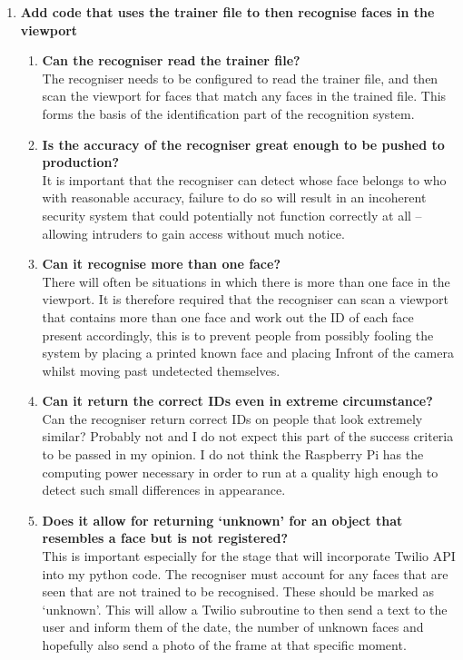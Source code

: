 \documentclass[9pt]{article}
\begin{document}
\begin{small}
\begin{enumerate}
		\item \textbf{Add code that uses the trainer file to then recognise faces in the viewport}
		\begin{enumerate}
			\item \textbf{Can the recogniser read the trainer file?}\\
				The recogniser needs to be configured to read the trainer file, and then scan the viewport for faces that match any faces in the trained file. This forms the basis of the identification part of the recognition system.
			\item \textbf{Is the accuracy of the recogniser great enough to be pushed to production?}\\
				It is important that the recogniser can detect whose face belongs to who with reasonable accuracy, failure to do so will result in an incoherent security system that could potentially not function correctly at all – allowing intruders to gain access without much notice.
			\item \textbf{Can it recognise more than one face?}\\
				There will often be situations in which there is more than one face in the viewport. It is therefore required that the recogniser can scan a viewport that contains more than one face and work out the ID of each face present accordingly, this is to prevent people from possibly fooling the system by placing a printed known face and placing Infront of the camera whilst moving past undetected themselves.
			\item \textbf{Can it return the correct IDs even in extreme circumstance?}\\
				Can the recogniser return correct IDs on people that look extremely similar? Probably not and I do not expect this part of the success criteria to be passed in my opinion. I do not think the Raspberry Pi has the computing power necessary in order to run at a quality high enough to detect such small differences in appearance.
			\item \textbf{Does it allow for returning ‘unknown’ for an object that resembles a face but is not registered?}\\
				This is important especially for the stage that will incorporate Twilio API into my python code. The recogniser must account for any faces that are seen that are not trained to be recognised. These should be marked as ‘unknown’. This will allow a Twilio subroutine to then send a text to the user and inform them of the date, the number of unknown faces and hopefully also send a photo of the frame at that specific moment.
		\end{enumerate}
		

\end{enumerate}
\end{small}
\end{document}
